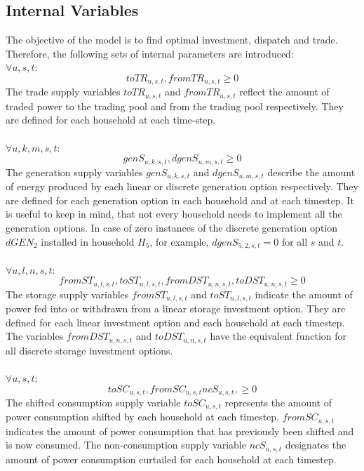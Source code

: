 \documentclass[
	11pt,								%
	DIV10,								%
	a4paper,         					%
	oneside,							%
	headheight=20pt,					%
	footheight=20pt,					%
    parskip=full,						%
    listof=totoc,						%
	bibliography=totoc,					%
	index=totoc,						%
]{scrartcl}
\begin{document}
\subsection{Internal Variables}
The objective of the model is to find optimal investment, dispatch and trade. Therefore, the following sets of internal parameters are introduced:
	\\
	$\forall u,s,t$:
	\begin{equation}
		toTR_{u,s,t}, fromTR_{u,s,t} \geq 0
	\end{equation}
	The trade supply variables $toTR_{u,s,t}$ and $fromTR_{u,s,t}$ reflect the amount of traded power to the trading pool and from the trading pool respectively. They are defined for each household at each time-step.
	\\\\
	$\forall u,k,m,s,t$:
	\begin{equation}
		genS_{u,k,s,t}, dgenS_{u,m,s,t} \geq 0
	\end{equation}
	The generation supply variables $genS_{u,k,s,t}$ and $dgenS_{u,m,s,t}$ describe the amount of energy produced by each linear or discrete generation option respectively. They are defined for each generation option in each household and at each timestep. It is useful to keep in mind, that not every household needs to implement all the generation options. In case of zero instances of the discrete generation option $dGEN_2$ installed in household $H_5$, for example, $dgenS_{5,2,s,t} = 0$ for all $s$ and $t$.
	\\\\
	$\forall u,l,n,s,t$:
	\begin{equation}
	fromST_{u,l,s,t}, toST_{u,l,s,t}, fromDST_{u,n,s,t}, toDST_{u,n,s,t} \geq 0
	\end{equation}
	The storage supply variables $fromST_{u,l,s,t}$ and $toST_{u,l,s,t}$ indicate the amount of power fed into or withdrawn from a linear storage investment option. They are defined for each linear investment option and each household at each timestep. The variables $fromDST_{u,n,s,t}$ and $toDST_{u,n,s,t}$ have the equivalent function for all discrete storage investment options.	
	\\\\
	$\forall u,s,t$:
	\begin{equation}
		toSC_{u,s,t}, fromSC_{u,s,t} ncS_{u,s,t},  \geq 0
	\end{equation}
	The shifted consumption supply variable $toSC_{u,s,t}$ represents the amount of power consumption shifted by each household at each timestep.  $fromSC_{u,s,t}$ indicates the amount of power consumption that has previously been shifted and is now consumed. The non-consumption supply variable $ncS_{u,s,t}$ designates the amount of power consumption curtailed for each household at each timestep.
\end{document}
